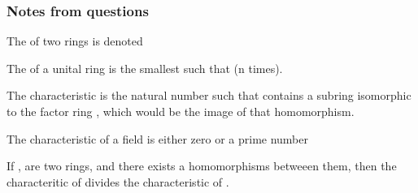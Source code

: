\subsubsection{Notes from questions}
\begin{D} The  of two rings  is denoted  \end{D}
\begin{D} The  of a unital ring  is the smallest  such that  (n times). \end{D}

\begin{R} The characteristic is the natural number  such that  contains a subring isomorphic to the factor ring , which would be the image of that homomorphism.\end{R}

\begin{R} The characteristic of a field is either zero or a prime number \end{R}
\begin{R} If ,  are two rings, and there exists a homomorphisms betweeen them, then the characteritic of  divides the characteristic of . \end{R}

